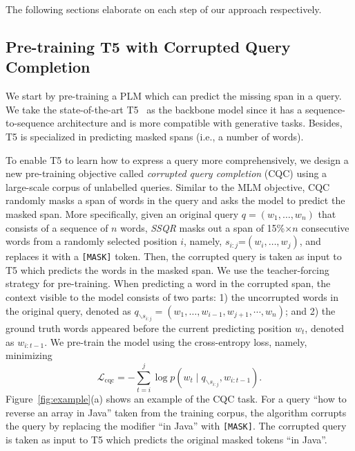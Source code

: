 \documentclass[sigconf,screen]{acmart}
\newcommand{\ie}{\hbox{i.e.}\xspace}
\newcommand{\ourmethod}{\textit{SSQR}\xspace}
\begin{document}
The following sections elaborate on each step of our approach respectively. 

\subsection{Pre-training T5 with Corrupted Query Completion}
\label{ss:approach:pretrain}



We start by pre-training a PLM which can predict the missing span in a query. 
We take the state-of-the-art T5~\cite{t5} as the backbone model since it has a sequence-to-sequence architecture and is more compatible with generative tasks. Besides, T5 is specialized in predicting masked spans (\ie, a number of words). 

To enable T5 to learn how to express a query more comprehensively, we design a new pre-training objective called \textit{corrupted query completion} (CQC) using a large-scale corpus of unlabelled queries. 
Similar to the MLM objective, CQC randomly masks a span of words in the query and asks the model to predict the masked span. 
More specifically, given an original query $q=\left(w_{1}, \ldots,  w_{n}\right)$ that consists of a sequence of $n$ words, \ourmethod masks out a span of 15\%$\times$$n$ consecutive words from a randomly selected position $i$, namely, $s_{i: j}$=$\left(w_{i}, \ldots, w_{j}\right)$, and replaces it with a \texttt{[MASK]} token. 
Then, the corrupted query is taken as input to T5 which predicts the words in the masked span. 
We use the teacher-forcing strategy for pre-training. When predicting a word in the corrupted span, the context visible to the model consists of two parts: 1) the uncorrupted words in the original query, denoted as $q_{\backslash s_{i: j}}=\left(w_{1}, \ldots, w_{i-1}, w_{j+1}, \cdots, w_{n}\right)$; and 2) the ground truth words appeared before the current predicting position $w_{t}$, denoted as $w_{i: t-1}$. We pre-train the model using the cross-entropy loss, namely, minimizing
\begin{equation}
\mathcal{L}_{\mathrm{cqc}}=-\sum_{t=i}^{j} \log p\left(w_{t} \mid q_{\backslash s_{i: j}}, w_{i: t-1}\right).
\end{equation}
Figure~\ref{fig:example}(a) shows an example of the CQC task. For a query ``how to reverse an array in Java'' taken from the training corpus, the algorithm corrupts the query by replacing the modifier ``in Java'' with \texttt{[MASK]}. The corrupted query is taken as input to T5 which predicts the original masked tokens ``in Java''.
\end{document}
